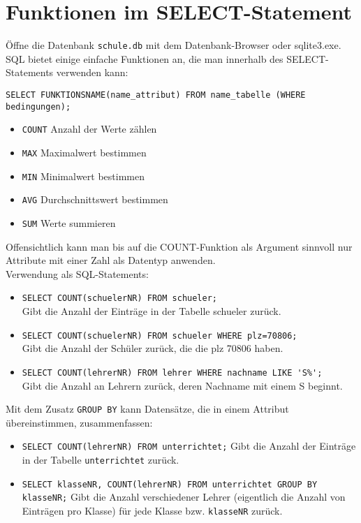 \section[Funktionen]{Funktionen im SELECT-Statement}
Öffne die Datenbank \texttt{schule.db} mit dem Datenbank-Browser oder sqlite3.exe.\\
SQL bietet einige einfache Funktionen an, die man innerhalb des SELECT-Statements verwenden kann:
\begin{tcolorbox}[title=Funktionen in SQL]
	\lstinline!SELECT FUNKTIONSNAME(name_attribut) FROM name_tabelle (WHERE bedingungen);!
\end{tcolorbox}
\begin{itemize}
	\item \lstinline!COUNT!	Anzahl der Werte zählen
	\item \lstinline!MAX!	Maximalwert bestimmen
	\item \lstinline!MIN!	Minimalwert bestimmen
	\item \lstinline!AVG!	Durchschnittswert bestimmen
	\item \lstinline!SUM!	Werte summieren
\end{itemize}

Offensichtlich kann man bis auf die COUNT-Funktion als Argument sinnvoll nur Attribute mit einer Zahl als Datentyp anwenden.\\
Verwendung als SQL-Statements:
\begin{itemize}
	\item \lstinline!SELECT COUNT(schuelerNR) FROM schueler;!\\
	Gibt die Anzahl der Einträge in der Tabelle schueler zurück.
	\item \lstinline!SELECT COUNT(schuelerNR) FROM schueler WHERE plz=70806;!\\
	Gibt die Anzahl der Schüler zurück, die die plz 70806 haben.
	\item \lstinline!SELECT COUNT(lehrerNR) FROM lehrer WHERE nachname LIKE 'S%';!\\
	Gibt die Anzahl an Lehrern zurück, deren Nachname mit einem S beginnt.
\end{itemize}
Mit dem Zusatz \lstinline!GROUP BY! kann Datensätze, die in einem Attribut übereinstimmen, zusammenfassen:
\begin{itemize}
	\item \lstinline!SELECT COUNT(lehrerNR) FROM unterrichtet;!
	Gibt die Anzahl der Einträge in der Tabelle \lstinline!unterrichtet! zurück.
	\item \lstinline!SELECT klasseNR, COUNT(lehrerNR) FROM unterrichtet GROUP BY klasseNR;!
	Gibt die Anzahl verschiedener Lehrer (eigentlich die Anzahl von Einträgen pro Klasse) für jede Klasse bzw. \lstinline!klasseNR! zurück.
\end{itemize}

